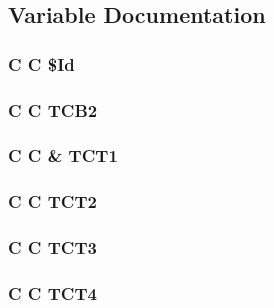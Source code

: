 \subsection{Variable Documentation}
\hypertarget{turb_8com_af40bd3a96fc1553c00422342f92046b8}{
\subsubsection[{\$\-Id}]{\setlength{\rightskip}{0pt plus 5cm}C C \$Id}}\label{turb_8com_af40bd3a96fc1553c00422342f92046b8}
\hypertarget{turb_8com_aa029a08b7d96afae971ad6b66644fc47}{
\subsubsection[{T\-C\-B2}]{\setlength{\rightskip}{0pt plus 5cm}C C T\-C\-B2}}\label{turb_8com_aa029a08b7d96afae971ad6b66644fc47}
\hypertarget{turb_8com_a303ad05cf974ceddc5009d1f0dd00ac8}{
\subsubsection[{T\-C\-T1}]{\setlength{\rightskip}{0pt plus 5cm}C C \& T\-C\-T1}}\label{turb_8com_a303ad05cf974ceddc5009d1f0dd00ac8}
\hypertarget{turb_8com_a8fed9efb9f6a6fb40cf920135855ffcf}{
\subsubsection[{T\-C\-T2}]{\setlength{\rightskip}{0pt plus 5cm}C C T\-C\-T2}}\label{turb_8com_a8fed9efb9f6a6fb40cf920135855ffcf}
\hypertarget{turb_8com_a7018ba2eaa3b6ebcf121e8d87ea8190c}{
\subsubsection[{T\-C\-T3}]{\setlength{\rightskip}{0pt plus 5cm}C C T\-C\-T3}}\label{turb_8com_a7018ba2eaa3b6ebcf121e8d87ea8190c}
\hypertarget{turb_8com_a1f51e8ca66b410b1ce1046689d2e332f}{
\subsubsection[{T\-C\-T4}]{\setlength{\rightskip}{0pt plus 5cm}C C T\-C\-T4}}\label{turb_8com_a1f51e8ca66b410b1ce1046689d2e332f}
